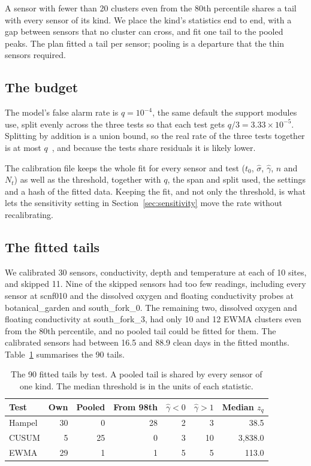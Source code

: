 \documentclass{article}
\begin{document}
A sensor with fewer than 20 clusters even from the 80th percentile shares a
tail with every sensor of its kind. We place the kind's statistics end to end,
with a gap between sensors that no cluster can cross, and fit one tail to the
pooled peaks. The plan fitted a tail per sensor; pooling is a departure that
the thin sensors required.

\subsection{The budget}
\label{sec:budget}

The model's false alarm rate is $q = 10^{-4}$, the same default the support
modules use, split evenly across the three tests so that each test gets
$q/3 = 3.33 \times 10^{-5}$. Splitting by addition is a union bound, so the
real rate of the three tests together is at most $q$~\citep{dunn1961multiple},
and because the tests share residuals it is likely lower.

The calibration file keeps the whole fit for every sensor and test
($t_{0}$, $\hat{\sigma}$, $\hat{\gamma}$, $n$ and $N_{t}$) as well as the
threshold, together with $q$, the span and split used, the settings and a hash
of the fitted data. Keeping the fit, and not only the threshold, is what lets
the sensitivity setting in Section~\ref{sec:sensitivity} move the rate without
recalibrating.

\subsection{The fitted tails}
\label{sec:fitted}

We calibrated 30 sensors, conductivity, depth and temperature at each of 10
sites, and skipped 11. Nine of the skipped sensors had too few readings,
including every sensor at scnf010 and the dissolved oxygen and floating
conductivity probes at botanical\_garden and south\_fork\_0. The remaining two,
dissolved oxygen and floating conductivity at south\_fork\_3, had only 10 and
12 EWMA clusters even from the 80th percentile, and no pooled tail could be
fitted for them. The calibrated sensors had between 16.5 and 88.9 clean days in
the fitted months. Table~\ref{tab:tails} summarises the 90 tails.

\begin{table}[t]
  \centering
  \caption{The 90 fitted tails by test. A pooled tail is shared by every sensor
    of one kind. The median threshold is in the units of each statistic.}
  \label{tab:tails}
  \begin{tabular}{lrrrrrr}
    \toprule
    Test & Own & Pooled & From 98th & $\hat{\gamma} < 0$ & $\hat{\gamma} > 1$ & Median $z_{q}$ \\
    \midrule
    Hampel & 30 & 0  & 28 & 2 & 3  & 38.5 \\
    CUSUM  & 5  & 25 & 0  & 3 & 10 & 3{,}838.0 \\
    EWMA   & 29 & 1  & 1  & 5 & 5  & 113.0 \\
    \bottomrule
  \end{tabular}
\end{table}
\end{document}
